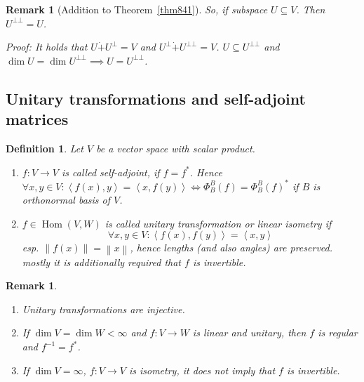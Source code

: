 \documentclass{article}
\newcounter{lecref}[section]
\numberwithin{lecref}{section}
\newtheorem{definition}[lecref]{Definition}
\newtheorem{remark}[lecref]{Remark}
\newcommand{\ip}[2]{\left\langle#1,#2\right\rangle} %
\newcommand{\norm}[1]{\left\|#1\right\|}
\DeclareMathOperator{\Hom}{Hom}
\begin{document}
\begin{remark}[Addition to Theorem~\ref{thm841}]
  So, if subspace $U \subseteq V$. Then $U^{\bot\bot} = U$.

  Proof: It holds that $U \dot{+} U^\bot = V$ and $U^\bot \dot{+} U^{\bot\bot} = V$.
  $U \subseteq U^{\bot\bot}$ and $\dim{U} = \dim{U}^{\bot\bot} \implies U = U^{\bot\bot}$.
\end{remark}

\subsection{Unitary transformations and self-adjoint matrices}
\begin{definition} %
  Let $V$ be a vector space with scalar product.
  \begin{enumerate}
    \item $f: V \to V$ is called \emph{self-adjoint}, if $f = f^*$.
      Hence $\forall x, y \in V: \ip{f(x)}{y} = \ip{x}{f(y)} \iff \Phi_B^B(f) = \Phi_B^B(f)^*$
      if $B$ is orthonormal basis of $V$.
    \item
      $f \in \Hom(V,W)$ is called \emph{unitary transformation} or \emph{linear isometry} if
      \[ \forall x,y \in V: \ip{f(x)}{f(y)} = \ip{x}{y} \]
      esp. $\norm{f(x)} = \norm{x}$, hence lengths (and also angles) are preserved. \\
      \emph{mostly} it is additionally required that $f$ is invertible.
  \end{enumerate}
\end{definition}

\begin{remark} %
  \label{bem868}
  \begin{enumerate}
    \item Unitary transformations are injective.
    \item If $\dim{V} = \dim{W} < \infty$ and $f: V \to W$ is linear and unitary,
    then $f$ is regular and $f^{-1} = f^*$.
    \item If $\dim{V} = \infty$, $f: V \to V$ is isometry, it does not imply that $f$ is invertible.
  \end{enumerate}
\end{remark}
\end{document}
